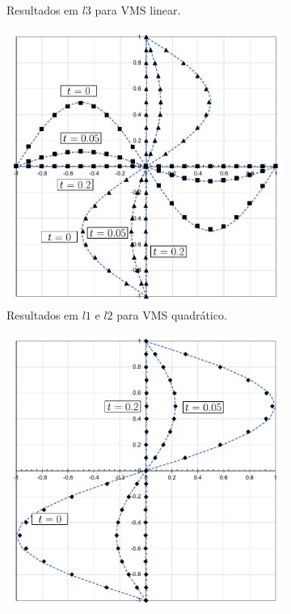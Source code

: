 \begin{figure}[h]
\begin{subfigure}{0.42\textwidth}
    \caption{Resultados em $l3$ para VMS linear.}
    \end{subfigure}
    \begin{subfigure}{0.42\textwidth}
    \includegraphics[width=\linewidth]{Figuras/taylor-green/VMS-Qua.pdf}
    \caption{Resultados em $l1$ e $l2$ para VMS quadrático.}
    \end{subfigure}
    \begin{subfigure}{0.42\textwidth}
    \includegraphics[width=\linewidth]{Figuras/taylor-green/VMS-Qua-uz.pdf}

\end{subfigure}
\end{figure}
